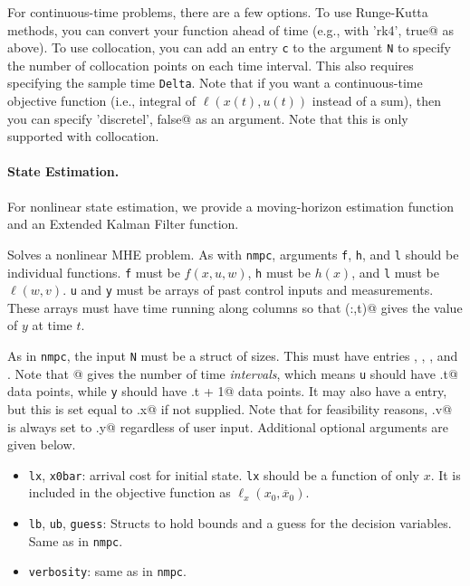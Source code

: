 \documentclass{article}
\begin{document}
\begin{multicols}{2}
For continuous-time problems, there are a few options.
To use Runge-Kutta methods, you can convert your function ahead of time (e.g., with \lstinline@'rk4', true@ as above).
To use collocation, you can add an entry \lstinline|c| to the argument \texttt{N} to specify the number of collocation points on each time interval.
This also requires specifying the sample time \texttt{Delta}.
Note that if you want a continuous-time objective function (i.e., integral of $\ell(x(t),u(t))$ instead of a sum), then you can specify \lstinline@'discretel', false@ as an argument.
Note that this is only supported with collocation.

\paragraph*{State Estimation.}

For nonlinear state estimation, we provide a moving-horizon estimation function and an Extended Kalman Filter function.


Solves a nonlinear MHE problem.
As with \texttt{nmpc}, arguments \texttt{f}, \texttt{h}, and \texttt{l} should be individual \casadi{} functions.
\texttt{f} must be $f(x,u,w)$, \texttt{h} must be $h(x)$, and \texttt{l} must be $\ell(w,v)$.
\texttt{u} and \texttt{y} must be arrays of past control inputs and measurements.
These arrays must have time running along columns so that \lstinline@y(:,t)@ gives the value of $y$ at time $t$.

As in \texttt{nmpc}, the input \texttt{N} must be a struct of sizes.
This must have entries \lstinline@t@, \lstinline@x@, \lstinline@u@, and \lstinline@y@.
Note that \lstinline@N[t]@ gives the number of time \emph{intervals}, which means \texttt{u} should have \lstinline@N.t@ data points, while \texttt{y} should have \lstinline@N.t + 1@ data points.
It may also have a \lstinline@w@ entry, but this is set equal to \lstinline@N.x@ if not supplied.
Note that for feasibility reasons, \lstinline@N.v@ is always set to \lstinline@N.y@ regardless of user input. Additional optional arguments are given below.

\begin{itemize}[noitemsep,nolistsep]
    \item \texttt{lx}, \texttt{x0bar}: arrival cost for initial state.
    \texttt{lx} should be a \casadi{} function of only $x$.
    It is included in the objective function as $\ell_x(x_0, \overline{x}_0)$.
    \item \texttt{lb}, \texttt{ub}, \texttt{guess}: Structs to hold bounds and a guess for the decision variables.
    Same as in \texttt{nmpc}.
    \item \texttt{verbosity}: same as in \texttt{nmpc}.
\end{itemize}


\end{multicols}
\end{document}
